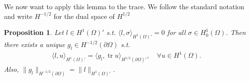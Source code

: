 \documentclass[12pt,a4paper]{article}
\numberwithin{equation}{subsection}
\numberwithin{lemma}{subsection}
\newtheorem{proposition}[lemma]{Proposition}
\theoremstyle{definition}
\DeclareMathOperator{\tr}{tr}
\begin{document}
We now want to apply this lemma to the trace. 
We follow the standard notation and write $H^{-1/2}$ for the dual space of 
$H^{1/2}$
\begin{proposition}\label{prop:existence_gl_in_H12}
    Let $l \in H^1(\Omega)'$ s.t. $\langle l, \sigma \rangle_{H^1(\Omega)'} = 0$
    for all $\sigma \in H^1_0(\Omega)$. Then there exists a unique
    $g_l \in H^{-1/2}(\partial \Omega)$ s.t.
    \begin{align}
        \langle l, u \rangle_{H^1(\Omega)'} = \langle g_l, \tr u \rangle_{H^{1/2}(\partial \Omega)'}, 
            \quad \forall u \in H^1(\Omega). \label{eq:functional_as_trace_inner_product}
    \end{align}
    Also,
    $\lVert g_l \rVert _{H^{-1/2}(\partial \Omega)} = \lVert l \rVert _{H^1(\Omega)'}$.
\end{proposition}
\end{document}
